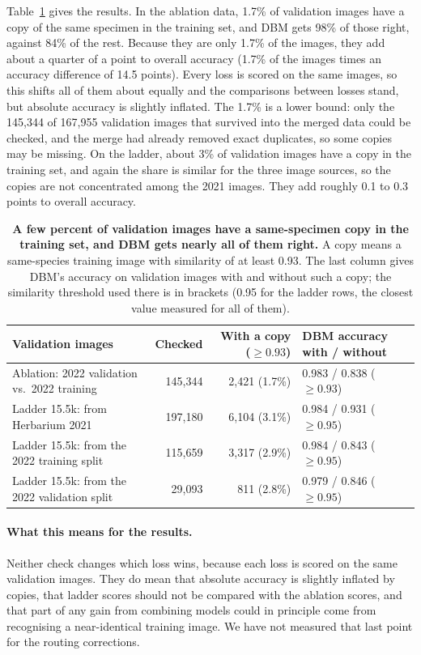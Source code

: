 \documentclass[11pt]{article}
\begin{document}
Table~\ref{tab:copies} gives the results. In the ablation data, 1.7\% of validation images
have a copy of the same specimen in the training set, and DBM gets 98\% of those right,
against 84\% of the rest. Because they are only 1.7\% of the images, they add about a
quarter of a point to overall accuracy (1.7\% of the images times an accuracy difference of
14.5 points). Every loss is scored on the same images, so this shifts all of them about
equally and the comparisons between losses stand, but absolute accuracy is slightly
inflated. The 1.7\% is a lower bound: only the 145{,}344 of 167{,}955 validation images that
survived into the merged data could be checked, and the merge had already removed exact
duplicates, so some copies may be missing. On the ladder, about 3\% of validation images
have a copy in the training set, and again the share is similar for the three image
sources, so the copies are not concentrated among the 2021 images. They add roughly 0.1 to
0.3 points to overall accuracy.

\begin{table}[t]
\centering
\small
\caption{\textbf{A few percent of validation images have a same-specimen copy in the
training set, and DBM gets nearly all of them right.} A copy means a same-species training
image with similarity of at least 0.93. The last column gives DBM's accuracy on validation
images with and without such a copy; the similarity threshold used there is in brackets
(0.95 for the ladder rows, the closest value measured for all of them).}
\label{tab:copies}
\footnotesize
\setlength{\tabcolsep}{4pt}
\begin{tabular}{@{}p{1.75in}rrp{1.2in}@{}}
\toprule
Validation images & Checked & With a copy ($\ge 0.93$) & DBM accuracy with / without \\
\midrule
Ablation: 2022 validation vs.\ 2022 training & 145{,}344 & 2{,}421 (1.7\%) & 0.983 / 0.838 ($\ge 0.93$) \\
Ladder 15.5k: from Herbarium 2021 & 197{,}180 & 6{,}104 (3.1\%) & 0.984 / 0.931 ($\ge 0.95$) \\
Ladder 15.5k: from the 2022 training split & 115{,}659 & 3{,}317 (2.9\%) & 0.984 / 0.843 ($\ge 0.95$) \\
Ladder 15.5k: from the 2022 validation split & 29{,}093 & 811 (2.8\%) & 0.979 / 0.846 ($\ge 0.95$) \\
\bottomrule
\end{tabular}
\end{table}

\paragraph{What this means for the results.} Neither check changes which loss wins, because
each loss is scored on the same validation images. They do mean that absolute accuracy is
slightly inflated by copies, that ladder scores should not be compared with the ablation
scores, and that part of any gain from combining models could in principle come from
recognising a near-identical training image. We have not measured that last point for the
routing corrections.
\end{document}
